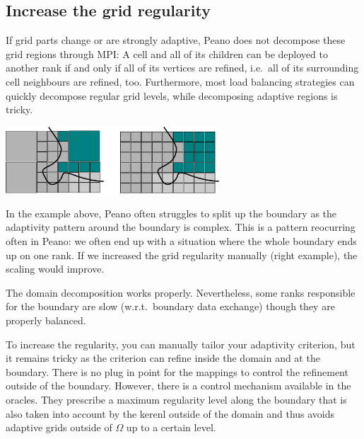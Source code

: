 {\subsection{Increase the grid regularity}
\label{section:mpi:quick-tuning:grid-regularity}


If grid parts change or are strongly adaptive, Peano does not decompose these
grid regions through MPI:
A cell and all of its children can be deployed to another rank if and only if
all of its vertices are refined, i.e.~all of its surrounding cell neighbours are
refined, too.
Furthermore, most load balancing strategies can quickly decompose regular
grid levels, while decomposing adaptive regions is tricky.

\begin{center}
  \includegraphics[width=0.6\textwidth]{62_quick-tuning/regularity.pdf}
\end{center}

\noindent
In the example above, Peano often struggles to split up the boundary as the
adaptivity pattern around the boundary is complex.
This is a pattern reocurring often in Peano:
we often end up with a situation where the whole boundary ends up on one rank.
If we increased the grid regularity manually (right example), the scaling
would improve.

\begin{smell}
  The domain decomposition works properly. Nevertheless, some ranks responsible
  for the boundary are slow (w.r.t.~boundary data exchange) though they are
  properly balanced.
\end{smell}

\noindent
To increase the regularity, you can manually tailor your adaptivity criterion,
but it remains tricky as the criterion can refine inside the domain and at the
boundary.
There is no plug in point for the mappings to control the refinement outside of
the boundary. 
However, there is a control mechanism available in the oracles.
They prescribe a maximum regularity level along the boundary that is 
also taken into account by the kerenl outside of the domain and thus avoids
adaptive grids outside of $\Omega $ up to a certain level.

}
